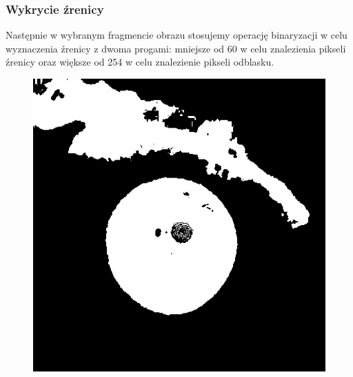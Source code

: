 \documentclass{beamer}
\begin{document}
\begin{frame}
\frametitle{Wykrycie źrenicy}
Następnie w wybranym fragmencie obrazu stosujemy operację binaryzacji w celu wyznaczenia źrenicy z dwoma progami: mniejsze od 60 w celu znalezienia pikseli źrenicy oraz większe od 254 w celu znalezienie pikseli odblasku.
\begin{figure}
\begin{center}
\includegraphics[scale=0.25]{bin.jpg}
\end{center}
\end{figure}
\end{frame}

\end{document}
